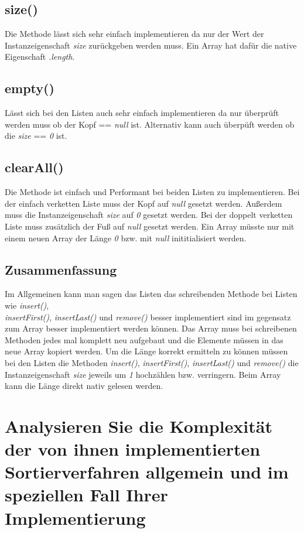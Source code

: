 \documentclass[a4paper, 11pt]{article}
\begin{document}
\subsection*{size()}
Die Methode lässt sich sehr einfach implementieren da nur der Wert der Instanzeigenschaft \textit{size} zurückgeben
werden muss. Ein Array hat dafür die native Eigenschaft \textit{.length}.

\subsection*{empty()}
Lässt sich bei den Listen auch sehr einfach implementieren da nur überprüft werden muss ob der Kopf == \textit{null} ist.
Alternativ kann auch überpüft werden ob die \textit{size} == \textit{0} ist.

\subsection*{clearAll()}
Die Methode ist einfach und Performant bei beiden Listen zu implementieren. Bei der einfach verketten Liste muss der
Kopf auf \textit{null} gesetzt werden. Außerdem muss die Instanzeigenschaft \textit{size} auf \textit{0} gesetzt werden.
Bei der doppelt verketten Liste muss zusätzlich der Fuß auf \textit{null} gesetzt werden. Ein Array müsste nur mit einem
neuen Array der Länge \textit{0} bzw. mit \textit{null} inititialisiert werden.


\subsection*{Zusammenfassung}
Im Allgemeinen kann man sagen das Listen das schreibenden Methode bei Listen wie \textit{insert()}, \\
\textit{insertFirst()}, \textit{insertLast()} und \textit{remove()} besser implementiert sind im gegensatz zum Array
besser implementiert werden können. Das Array muss bei schreibenen Methoden jedes mal komplett neu aufgebaut und die
Elemente müssen in das neue Array kopiert werden. Um die Länge korrekt ermitteln zu können müssen bei den Listen die
Methoden \textit{insert()}, \textit{insertFirst()}, \textit{insertLast()} und \textit{remove()}  die Instanzeigenschaft
\textit{size} jeweils um \textit{1} hochzählen bzw. verringern. Beim Array kann die Länge direkt nativ gelesen werden.

\section*{Analysieren Sie die Komplexität der von ihnen implementierten Sortierverfahren
          allgemein und im speziellen Fall Ihrer Implementierung}
\end{document}
